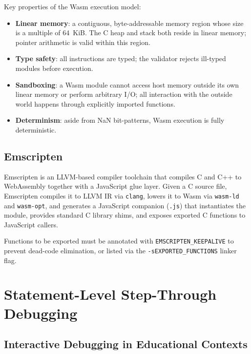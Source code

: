 Key properties of the Wasm execution model:

\begin{itemize}
  \item \textbf{Linear memory}: a contiguous, byte-addressable memory region whose
        size is a multiple of 64~KiB.  The C heap and stack both reside in linear
        memory; pointer arithmetic is valid within this region.

  \item \textbf{Type safety}: all instructions are typed; the validator rejects
        ill-typed modules before execution.

  \item \textbf{Sandboxing}: a Wasm module cannot access host memory outside its
        own linear memory or perform arbitrary I/O; all interaction with the outside
        world happens through explicitly imported functions.

  \item \textbf{Determinism}: aside from NaN bit-patterns, Wasm execution is fully
        deterministic.
\end{itemize}

\subsection{Emscripten}

Emscripten \cite{emscripten} is an LLVM-based compiler toolchain that compiles C
and C++ to WebAssembly together with a JavaScript glue layer.  Given a C source
file, Emscripten compiles it to LLVM IR via \texttt{clang}, lowers it to Wasm
via \texttt{wasm-ld} and \texttt{wasm-opt}, and generates a JavaScript companion
(\texttt{.js}) that instantiates the module, provides standard C library shims,
and exposes exported C functions to JavaScript callers.

Functions to be exported must be annotated with \texttt{EMSCRIPTEN\_KEEPALIVE}
to prevent dead-code elimination, or listed via the
\texttt{-sEXPORTED\_FUNCTIONS} linker flag.


\section{Statement-Level Step-Through Debugging}
\label{sec:debugging}

\subsection{Interactive Debugging in Educational Contexts}

